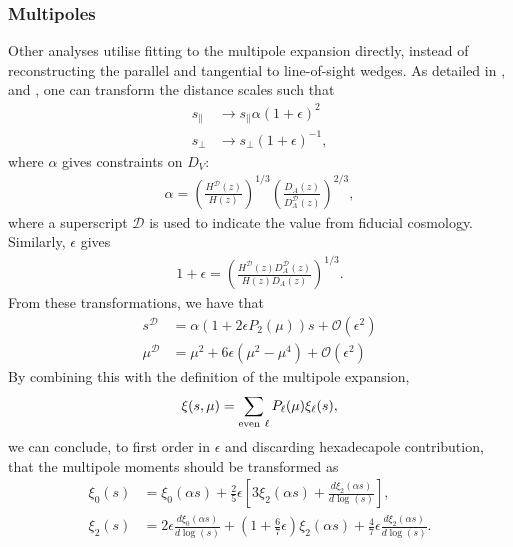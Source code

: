 \documentclass[titlesmallcaps, examinerscopy, copyrightpage]{uqthesis}
\begin{document}
\subsubsection{Multipoles} \label{sec:prior:cor:mp}

Other analyses utilise fitting to the multipole expansion directly, instead of reconstructing the parallel and tangential to line-of-sight wedges. As detailed in \citet{PadmanabhanWhite2008}, \citet{KazinSanchezBlanton2012} and \citet{XuCuesta2013}, one can transform the distance scales such that
\begin{align}
s_\parallel &\rightarrow s_\parallel \alpha (1 + \epsilon)^2 \\
s_\perp &\rightarrow s_\perp (1 + \epsilon)^{-1},
\end{align}
where $\alpha$ gives constraints on $D_V$:
\begin{align}
\alpha = \left( \frac{H^{\mathcal{D}}(z)}{H(z)}\right) ^{1/3} \left( \frac{D_A(z)}{D_A^{\mathcal{D}}(z)} \right)^{2/3},
\end{align}
where a superscript $\mathcal{D}$ is used to indicate the value from fiducial cosmology. Similarly, $\epsilon$ gives
\begin{align}
1 + \epsilon = \left( \frac{H^{\mathcal{D}}(z) D_A^{\mathcal{D}}(z)}{H(z) D_A(z)} \right) ^{1/3}.
\end{align}
From these transformations, we have that
\begin{align}
s^\mathcal{D} &= \alpha (1 + 2\epsilon P_2(\mu)) s + \mathcal{O}(\epsilon^2) \\
\mu^\mathcal{D} &= \mu^2 + 6 \epsilon (\mu^2 - \mu^4) + \mathcal{O}(\epsilon^2)
\end{align}
By combining this with the definition of the multipole expansion,
\begin{align}
\xi(s, \mu) = \sum\limits_{\rm{even }\ \ell} P_\ell(\mu) \xi_\ell(s),
\end{align}
we can conclude, to first order in $\epsilon$ and discarding hexadecapole contribution, that the multipole moments should be transformed as \citep{KazinSanchezBlanton2012}
\begin{align}
\xi_0(s) &= \xi_0(\alpha s) + \frac{2}{5}\epsilon \left[ 3 \xi_2(\alpha s) + \frac{d \xi_2(\alpha s)}{d \log(s)}\right], \label{eq:ximp}\\
\xi_2(s) &= 2\epsilon \frac{d \xi_0(\alpha s)}{d\log(s)} + \left( 1 + \frac{6}{7}\epsilon\right) \xi_2(\alpha s) + \frac{4}{7} \epsilon \frac{d \xi_2(\alpha s)}{d \log(s)}. \label{eq:multipoles} 
\end{align}
\end{document}
